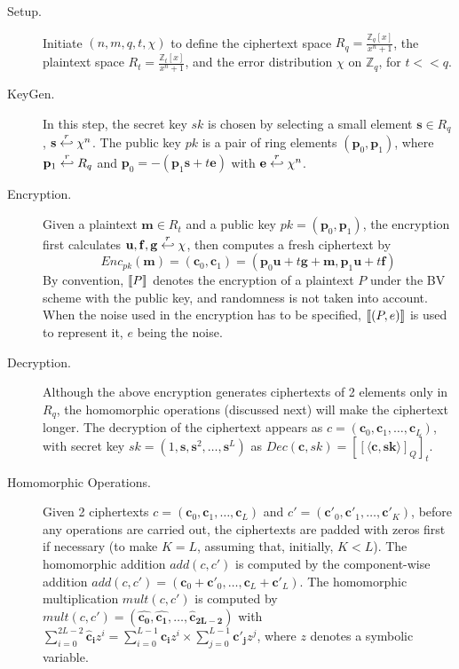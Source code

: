 \begin{description}
\item[Setup.] Initiate $(n,m,q,t, \chi)$ to define the ciphertext space $R_q = \frac{\mathbb{Z}_{q}[x]}{x^{n} + 1}$,
  the plaintext space $R_t = \frac{\mathbb{Z}_{t}[x]}{x^{n} + 1}$, and the error
  distribution $\chi$ on $\mathbb{Z}_{q}$, for \(t << q\).
\item[KeyGen.] In this step, the secret key $sk$ is chosen by selecting a small element
  $\mathbf{s} \in R_{q}$, $\mathbf{s} \stackrel{r}{\hookleftarrow} \chi^{n}$. The public key $pk$ is a pair of ring elements
  $(\mathbf{p}_0,\mathbf{p}_1)$, where $\mathbf{p}_1 \stackrel{r}{\hookleftarrow} R_q$ and
  $\mathbf{p}_0 = -(\mathbf{p}_1\mathbf{s} + t\mathbf{e})$ with
  $\mathbf{e} \stackrel{r}{\hookleftarrow} \chi^{n}$.
\item[Encryption.] Given a plaintext $\mathbf{m} \in R_t$ and a public key
  $pk=(\mathbf{p}_0,\mathbf{p}_1)$, the encryption first calculates
  $\mathbf{u},\mathbf{f},\mathbf{g} \stackrel{r}{\hookleftarrow} \chi$, then computes a fresh
  ciphertext by
    \[
      Enc_{pk}(\mathbf{m}) = (\mathbf{c}_0,\mathbf{c}_1) =
      (\mathbf{p}_0\mathbf{u} + t\mathbf{g} + \mathbf{m},
      \mathbf{p}_1\mathbf{u} + t\mathbf{f})
    \]
    By convention, $\left\llbracket P\right\rrbracket$ denotes the encryption of a plaintext $P$ under the
    BV scheme with the public key, and randomness is not taken into
    account. When the noise used in the encryption has to be specified,
    $\left\llbracket(P,e)\right\rrbracket$ is used to represent it, $e$ being the noise.
  \item[Decryption.] Although the above encryption generates ciphertexts of 2
    elements only in $R_q$, the homomorphic operations (discussed next) will
    make the ciphertext longer. The decryption of the ciphertext appears as
    $c=(\mathbf{c}_0,\mathbf{c}_1,\dots,\mathbf{c}_L)$, with secret key
    $sk = (1, \mathbf{s}, \mathbf{s}^2,\dots, \mathbf{s}^L)$ as
    $ Dec(\mathbf{c},sk) = \left[\left[ \langle \mathbf{c}, \mathbf{sk} \rangle
      \right]_Q \right]_t $.
  \item[Homomorphic Operations.] Given 2 ciphertexts
    $c = (\mathbf{c}_0,\mathbf{c}_1,\dots,\mathbf{c}_L)$ and
    $c' = (\mathbf{c}'_0,\mathbf{c}'_1,\dots,\mathbf{c}'_K)$, before any
    operations are carried out, the ciphertexts are padded with zeros first if
    necessary (to make $K = L$, assuming that, initially, $K < L$).  The
    homomorphic addition $add(c,c')$ is computed by the component-wise addition
    $add(c,c') = (\mathbf{c}_0 +\mathbf{c}'_0, \dots,
    \mathbf{c}_L+\mathbf{c}'_L)$. The homomorphic multiplication $mult(c,c')$ is
    computed by
    $mult(c,c') = (\mathbf{\hat{c_0}}, \mathbf{\hat{c_1}}, \dots,
    \mathbf{\hat{c}_{2L-2}})$ with
    $ \sum_{i=0}^{2L-2}\mathbf{\hat{c}_i}z^i = \sum_{i=0}^{L-1}\mathbf{c_i}z^i
    \times \sum_{j=0}^{L-1}\mathbf{c'_j}z^j $, where $z$ denotes a symbolic
    variable.
\end{description}

